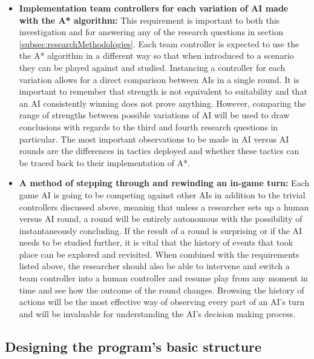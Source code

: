 \documentclass[11pt, a4paper]{report}
\begin{document}
\begin{itemize}
\item \textbf{Implementation team controllers for each variation of AI made with the A* algorithm:}
This requirement is important to both this investigation and for answering any of the research questions in section \ref{subsec:researchMethodologies}. Each team controller is expected to use the the A* algorithm in a different way so that when introduced to a scenario they can be played against and studied. Instancing a controller for each variation allows for a direct comparison between AIs in a single round. It is important to remember that strength is not equivalent to suitability and that an AI consistently winning does not prove anything. However, comparing the range of strengths between possible variations of AI will be used to draw conclusions with regards to the third and fourth research questions in particular. The most important observations to be made in AI versus AI rounds are the differences in tactics deployed and whether these tactics can be traced back to their implementation of A*.

\item \textbf{A method of stepping through and rewinding an in-game turn:}
Each game AI is going to be competing against other AIs in addition to the trivial controllers discussed above, meaning that unless a researcher sets up a human versus AI round, a round will be entirely autonomous with the possibility of instantaneously concluding. If the result of a round is surprising or if the AI needs to be studied further, it is vital that the history of events that took place can be explored and revisited. When combined with the requirements listed above, the researcher should also be able to intervene and switch a team controller into a human controller and resume play from any moment in time and see how the outcome of the round changes. Browsing the history of actions will be the most effective way of observing every part of an AI's turn and will be invaluable for understanding the AI's decision making process.

\end{itemize}

\subsection{Designing the program's basic structure}
\label{subsec:designingProgram}
\end{document}
